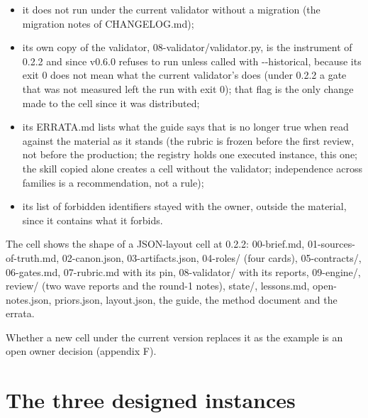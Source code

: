 \documentclass[
  american,
  10pt,
]{report}
\providecommand{\tightlist}{%
  \setlength{\itemsep}{0pt}\setlength{\parskip}{0pt}}
\renewcommand{\texttt}[1]{{\ttfamily\hyphenchar\font=-1 #1}}
\begin{document}
\begin{itemize}
\tightlist
\item
  it does not run under the current validator without a migration (the
  migration notes of \texttt{CHANGELOG.\allowbreak{}md});
\item
  its own copy of the validator,
  \texttt{08-\allowbreak{}validator/\allowbreak{}validator.\allowbreak{}py},
  is the instrument of 0.2.2 and since v0.6.0 refuses to run unless
  called with \texttt{-\allowbreak{}-\allowbreak{}historical}, because
  its exit 0 does not mean what the current validator's does (under
  0.2.2 a gate that was not measured left the run with exit 0); that
  flag is the only change made to the cell since it was distributed;
\item
  its \texttt{ERRATA.\allowbreak{}md} lists what the guide says that is
  no longer true when read against the material as it stands (the rubric
  is frozen before the first review, not before the production; the
  registry holds one executed instance, this one; the skill copied alone
  creates a cell without the validator; independence across families is
  a recommendation, not a rule);
\item
  its list of forbidden identifiers stayed with the owner, outside the
  material, since it contains what it forbids.
\end{itemize}

The cell shows the shape of a JSON-layout cell at 0.2.2:
\texttt{00-\allowbreak{}brief.\allowbreak{}md},
\texttt{01-\allowbreak{}sources-\allowbreak{}of-\allowbreak{}truth.\allowbreak{}md},
\texttt{02-\allowbreak{}canon.\allowbreak{}json},
\texttt{03-\allowbreak{}artifacts.\allowbreak{}json},
\texttt{04-\allowbreak{}roles/\allowbreak{}} (four cards),
\texttt{05-\allowbreak{}contracts/\allowbreak{}},
\texttt{06-\allowbreak{}gates.\allowbreak{}md},
\texttt{07-\allowbreak{}rubric.\allowbreak{}md} with its pin,
\texttt{08-\allowbreak{}validator/\allowbreak{}} with its reports,
\texttt{09-\allowbreak{}engine/\allowbreak{}},
\texttt{review/\allowbreak{}} (two wave reports and the round-1 notes),
\texttt{state/\allowbreak{}}, \texttt{lessons.\allowbreak{}md},
\texttt{open-\allowbreak{}notes.\allowbreak{}json},
\texttt{priors.\allowbreak{}json}, \texttt{layout.\allowbreak{}json},
the guide, the method document and the errata.

Whether a new cell under the current version replaces it as the example
is an open owner decision (appendix F).

\section{The three designed
instances}\label{the-three-designed-instances}
\end{document}
